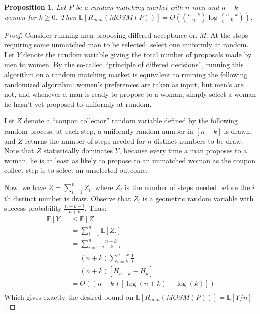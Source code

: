 \documentclass[12pt]{article}
\newcommand{\E}[1]{\mathbb{E}\left[{#1}\right]}
\newtheorem{proposition}[definition]{Proposition}
\begin{document}
  \begin{proposition}
    Let $P$ be a random matching market with $n$ men and $n+k$ women for $k\ge 0$.
    Then $\E{R_{men}(MOSM(P))}
    = O(\left(\frac{n+k} n\right)\log\left(\frac{n+k}{k}\right))$.
  \end{proposition}
  \begin{proof}
    Consider running men-proposing differed acceptance on $M$.
    At the steps requiring some unmatched man to be selected,
    select one uniformly at random.
    Let $Y$ denote the random variable giving the total number of proposals made
    by men to women.
    By the so-called ``principle of differed decisions'', running this algorithm
    on a random matching market is equivalent to running the following
    randomized algorithm:
    women's preferences are taken as input, but men's are not, and
    whenever a man is ready to propose to a woman, simply select a woman he hasn't
    yet proposed to uniformly at random.

    Let $Z$ denote a ``coupon collector'' random variable defined by the
    following random process: at each step, a uniformly random number in $[n+k]$
    is drawn, and $Z$ returns the number of steps needed for $n$ distinct
    numbers to be draw.
    Note that $Z$ statistically dominates $Y$, because every time a man proposes
    to a woman, he is at least as likely to propose to an unmatched woman as the
    coupon collect step is to select an unselected outcome.

    Now, we have $Z = \sum_{i=1}^n Z_i$, where $Z_i$ is the number of steps
    needed before the $i$th distinct number is draw.
    Observe that $Z_i$ is a geometric random variable with success probability
    $\frac{n+k-i} {n+k}$. Thus:
    \begin{align*}
      \E{Y} & \le \E{Z} \\
        & = \sum_{i=1}^n \E{Z_i} \\
        & = \sum_{i=1}^n \frac{n+k}{n+k-i} \\
        & = (n+k) \sum_{i=k}^{n+k} \frac{1}{i} \\
        & = (n+k)[H_{n+k} - H_k]  \\
        & = \Theta\left( (n+k)[\log(n+k) - \log(k)] \right)  \\
    \end{align*}
    Which gives exactly the desired bound on 
    $\E{R_{men}(MOSM(P))} = \E{Y / n}$.
  \end{proof}
\end{document}
